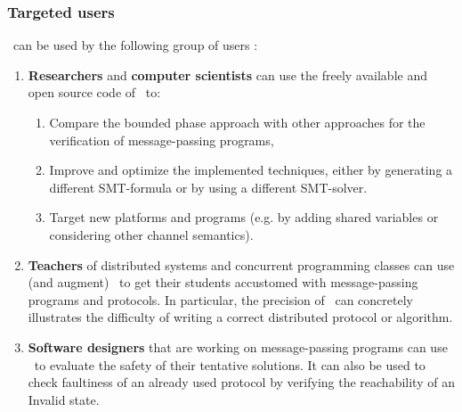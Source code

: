 \subsubsection{Targeted users}
%
\MPass\ can be used by the following group of users :
%
\begin{enumerate}
%
\item \textbf{Researchers} and \textbf{computer scientists} can use the freely available and open source code of \MPass\ to:
\begin{enumerate}
\item Compare the bounded phase approach with other approaches for the verification of message-passing programs,
\item Improve and optimize the implemented techniques,
either by generating a different \textsc{SMT}-formula or by using a different \textsc{SMT}-solver.
\item Target new platforms and programs (e.g. by adding shared variables or considering other channel semantics).
\end{enumerate}
%  
\item \textbf{Teachers} of distributed  systems  and concurrent programming classes can use (and augment) \MPass\ 
  to get their students accustomed with message-passing programs and protocols.
  In particular, the precision of \MPass\ can concretely illustrates the difficulty of writing a correct distributed protocol or algorithm.
%
\item \textbf{Software designers} that are working on message-passing programs can use \MPass\ to evaluate the safety of their tentative solutions.
  It can also be used to check faultiness of an already used protocol by verifying the reachability of an Invalid state.
%
\end{enumerate}